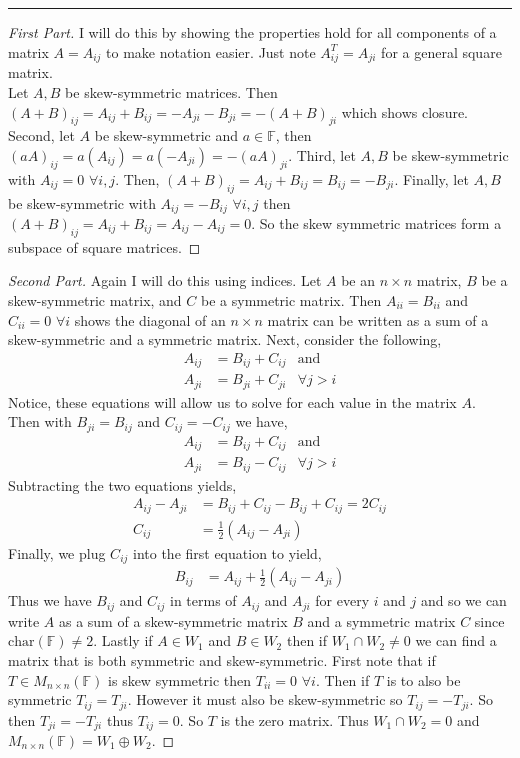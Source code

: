 \documentclass[leqno]{article}
\theoremstyle{nonumberplain}
\newtheorem{proof}{Proof}
\begin{document}
\noindent\rule[0.5ex]{\linewidth}{1pt}

\begin{proof}[First Part]
I will do this by showing the properties hold for all components of a matrix $A=A_{ij}$ to make notation easier. Just note $A_{ij}^T=A_{ji}$ for a general square matrix.\\
\noindent Let $A,B$ be skew-symmetric matrices. Then $(A+B)_{ij}=A_{ij}+B_{ij}=-A_{ji}-B_{ji}=-(A+B)_{ji}$ which shows closure. Second, let $A$ be skew-symmetric and $a\in \mathbb{F}$, then $(aA)_{ij}=a(A_{ij})=a(-A_{ji})=-(aA)_{ji}$.  Third, let $A, B$ be skew-symmetric with $A_{ij}=0$ $\forall i,j$.  Then, $(A+B)_{ij}=A_{ij}+B_{ij}=B_{ij}=-B_{ji}$.  Finally, let $A,B$ be skew-symmetric with $A_{ij}=-B_{ij}$ $\forall i,j$ then $(A+B)_{ij}=A_{ij}+B_{ij} = A_{ij}-A_{ij}=0$. So the skew symmetric matrices form a subspace of square matrices.
\end{proof}

\begin{proof}[Second Part]
Again I will do this using indices.  Let $A$ be an $n\times n$ matrix, $B$ be a skew-symmetric matrix, and $C$ be a symmetric matrix. Then $A_{ii}=B_{ii}$ and $C_{ii}=0$ $\forall i$ shows the diagonal of an $n \times n$ matrix can be written as a sum of a skew-symmetric and a symmetric matrix.  Next, consider the following,
\begin{align*}
A_{ij}&=B_{ij}+C_{ij} &\textrm{and}\\
A_{ji}&=B_{ji}+C_{ji} &\forall j>i
\end{align*}
Notice, these equations will allow us to solve for each value in the matrix $A$.  Then with $B_{ji}=B_{ij}$ and $C_{ij}=-C_{ij}$ we have,
\begin{align*}
A_{ij}&=B_{ij}+C_{ij} &\textrm{and}\\
A_{ji}&=B_{ij}-C_{ij} &\forall j>i
\end{align*}
Subtracting the two equations yields,
\begin{align*}
A_{ij}-A_{ji}&=B_{ij}+C_{ij}-B_{ij}+C_{ij}=2C_{ij}\\
C_{ij}&=\frac{1}{2}(A_{ij}-A_{ji})
\end{align*}
Finally, we plug $C_{ij}$ into the first equation to yield,
\begin{align*}
B_{ij}&=A_{ij}+\frac{1}{2}(A_{ij}-A_{ji})
\end{align*}
Thus we have $B_{ij}$ and $C_{ij}$ in terms of $A_{ij}$ and $A_{ji}$ for every $i$ and $j$ and so we can write $A$ as a sum of a skew-symmetric matrix $B$ and a symmetric matrix $C$ since $\textrm{char}(\mathbb{F})\neq 2$. Lastly if $A\in W_1$ and $B\in W_2$ then if $W_1\cap W_2\neq 0$ we can find a matrix that is both symmetric and skew-symmetric.  First note that if $T \in M_{n\times n}(\mathbb{F})$ is skew symmetric then $T_{ii}=0$ $\forall i$.  Then if $T$ is to also be symmetric $T_{ij}=T_{ji}$.  However it must also be skew-symmetric so $T_{ij}=-T_{ji}$.  So then $T_{ji}=-T_{ji}$ thus $T_{ij}=0$.  So $T$ is the zero matrix.  Thus $W_1 \cap W_2 = 0$ and $M_{n\times n}(\mathbb{F})=W_1\oplus W_2$. 
\end{proof}
\pagebreak
\end{document}
